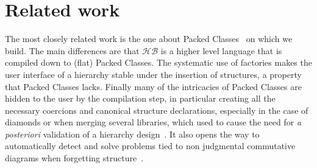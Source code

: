 \documentclass[a4paper,UKenglish,cleveref, autoref]{lipics-v2019}
\newcommand{\HB}{\ensuremath{\mathcal{HB}}}
\newcommand{\mixin}{mixin}
\newcommand{\factories}{factories}
\theoremstyle{implem}
\theoremstyle{implem}
\theoremstyle{command}
\theoremstyle{commands}
\begin{document}
{{%
%
%
%
%

\section{Related work}
The most closely related work is the one about Packed Classes~\cite{DBLP:conf/tphol/GarillotGMR09} on which we
build. The main differences are that \HB{} is a higher level language
that is compiled down to (flat) Packed Classes. The systematic use of
\factories{} makes the user interface of a hierarchy stable under the insertion of
structures, a property that Packed Classes lacks.
Finally many of the intricacies of Packed Classes are hidden to the user by
the compilation step, in particular creating all the necessary coercions and canonical structure declarations,
especially in the case of diamonds or when merging several libraries, which used to cause the need for \textit{a posteriori}
validation of a hierarchy design~\cite{KSdraft}. It also opens the way
to automatically detect and solve problems tied to non judgmental commutative diagrams when forgetting
structure~\cite{affeldt:hal-02463336}.


}}
\end{document}

